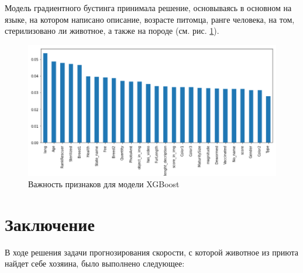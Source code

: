 \documentclass[14pt]{mmcs_article}
\begin{document}
Модель градиентного бустинга принимала решение, основываясь в основном на языке, на котором написано описание, возрасте питомца, ранге человека, на том, стерилизовано ли животное, а также на породе (см. рис. \ref{kaggle:boost}).


\begin{figure}[H]
	\centering
	\includegraphics[scale=0.7]{featuresboost.png}
	\caption{Важность признаков для модели XGBoost}\label{kaggle:boost}
\end{figure}


\newpage
{}
\section*{Заключение}

В ходе решения задачи прогнозирования скорости, с которой животное из приюта найдет себе хозяина, было выполнено следующее:
\end{document}
